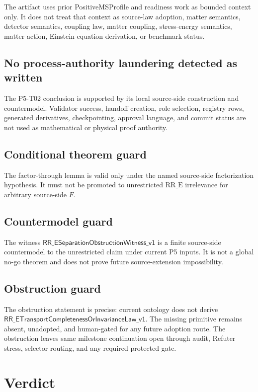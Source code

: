 \documentclass[11pt]{article}
\newcommand{\RRE}{\mathrm{RR\_E}}
\newcommand{\MissingLaw}{\mathsf{RR\_ETransportCompletenessOrInvarianceLaw\_v1}}
\newcommand{\Witness}{\mathsf{RR\_ESeparationObstructionWitness\_v1}}
\begin{document}
The artifact uses prior PositiveMSProfile and readiness work as bounded
context only.  It does not treat that context as source-law adoption, matter
semantics, detector semantics, coupling law, matter coupling, stress-energy
semantics, matter action, Einstein-equation derivation, or benchmark status.

\subsection{No process-authority laundering detected as written}

The P5-T02 conclusion is supported by its local source-side construction and
countermodel.  Validator success, handoff creation, role selection, registry
rows, generated derivatives, checkpointing, approval language, and commit
status are not used as mathematical or physical proof authority.

\subsection{Conditional theorem guard}

The factor-through lemma is valid only under the named source-side
factorization hypothesis.  It must not be promoted to unrestricted
\(\RRE\) irrelevance for arbitrary source-side \(F\).

\subsection{Countermodel guard}

The witness \(\Witness\) is a finite source-side countermodel to the
unrestricted claim under current P5 inputs.  It is not a global no-go theorem
and does not prove future source-extension impossibility.

\subsection{Obstruction guard}

The obstruction statement is precise: current ontology does not derive
\(\MissingLaw\).  The missing primitive remains absent, unadopted, and
human-gated for any future adoption route.  The obstruction leaves same
milestone continuation open through audit, Refuter stress, selector routing,
and any required protected gate.

\section{Verdict}
\end{document}
